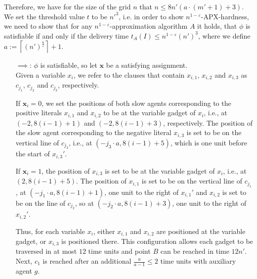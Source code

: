 Therefore, we have for the size of the grid $n$ that $n\leq 8n'(a\cdot (m'+1)+3)$.
We set the threshold value $t$ to be $n'^3$, i.e. in order to show $n^{1-\varepsilon}$-APX-hardness, we need to show that for any $n^{1-\varepsilon}$-approximation algorithm $A$ it holds, that $\phi$ is satisfiable if and only if the delivery time $t_A(I) \leq n^{1-\varepsilon}(n')^3$, where we define $a:=\left\lceil (n')^{\frac{6}{\varepsilon}} \right\rceil+1$.

\begin{enumerate}
\item[$\implies$:]
$\phi$ is satisfiable, so let $\mathbf{x}$ be a satisfying assignment.\\
Given a variable $x_i$, we refer to the clauses that contain $x_{i, 1}$, $x_{i, 2}$ and $x_{i, 3}$ as $c_{j_1}$, $c_{j_2}$ and  $c_{j_3}$, respectively.

If $\mathbf{x}_i = 0$, we set the positions of both slow agents corresponding to the positive literals $x_{i,1}$ and $x_{i,2}$ to be at the variable gadget of $x_i$, i.e., at $(-2, 8(i-1) + 1)$ and $(-2, 8(i-1) + 3)$, respectively. The position of the slow agent corresponding to the negative literal $x_{i,3}$ is set to be on the vertical line of $c_{j_3}$, i.e., at $(-j_3\cdot a, 8(i-1) + 5)$, which is one unit before the start of $x_{i,3}'$.

If $\mathbf{x}_i = 1$, the position of $x_{i,3}$ is set to be at the variable gadget of $x_i$, i.e., at $(2, 8(i-1) + 5)$. The position of $x_{i,1}$ is set to be on the vertical line of $c_{j_1}$, at $(-j_1\cdot a, 8(i-1) + 1)$, one unit to the right of $x_{i,1}'$ and $x_{i,2}$ is set to be on the line of $c_{j_2}$, so at $(-j_2\cdot a, 8(i-1) + 3)$, one unit to the right of $x_{i,2}'$. 

Thus, for each variable $x_i$, either $x_{i,1}$ and $x_{i,2}$ are positioned at the variable gadget, or $x_{i,3}$ is positioned there. This configuration allows each gadget to be traversed in at most $12$ time units and point $B$ can be reached in time $12n'$. Next, $c_1$ is reached after an additional $\frac{a}{a-1}\leq 2$ time units with auxiliary agent $g$.


\end{enumerate}
